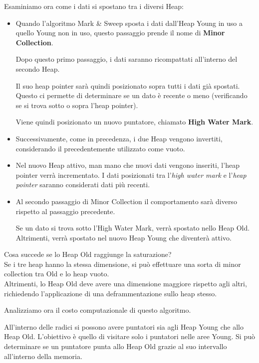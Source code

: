 \documentclass{article}
\begin{document}
Esaminiamo ora come i dati si spostano tra i diversi Heap:
\begin{itemize}
    \item Quando l'algoritmo Mark \& Sweep sposta i dati dall'Heap Young in uso a quello Young non in uso, questo passaggio prende il nome di \textbf{Minor Collection}.
    
    Dopo questo primo passaggio, i dati saranno ricompattati all'interno del secondo Heap.
    
    Il suo heap pointer sarà quindi posizionato sopra tutti i dati già spostati. Questo ci permette di determinare se un dato è recente o meno (verificando se si trova sotto o sopra l'heap pointer). 
    
    Viene quindi posizionato un nuovo puntatore, chiamato \textbf{High Water Mark}.
    \item Successivamente, come in precedenza, i due Heap vengono invertiti, considerando il precedentemente utilizzato come vuoto.
    \item Nel nuovo Heap attivo, man mano che nuovi dati vengono inseriti, l'heap pointer verrà incrementato. I dati posizionati tra l'\textit{high water mark} e l'\textit{heap pointer} saranno considerati dati più recenti. 
    \item Al secondo passaggio di Minor Collection il comportamento sarà diverso rispetto al passaggio precedente.
    
    Se un dato si trova sotto l'High Water Mark, verrà spostato nello Heap Old. Altrimenti, verrà spostato nel nuovo Heap Young che diventerà attivo.
\end{itemize}
\vspace{8pt}
Cosa succede se lo Heap Old raggiunge la saturazione?\\
Se i tre heap hanno la stessa dimensione, si può effettuare una sorta di minor collection tra Old e lo heap vuoto.\\
Altrimenti, lo Heap Old deve avere una dimensione maggiore rispetto agli altri, richiedendo l'applicazione di una deframmentazione sullo heap stesso.

\vspace{8pt}
Analizziamo ora il costo computazionale di questo algoritmo.

All'interno delle radici si possono avere puntatori sia agli Heap Young che allo Heap Old. L'obiettivo è quello di visitare solo i puntatori nelle aree Young. Si può determinare se un puntatore punta allo Heap Old grazie al suo intervallo all'interno della memoria.
\end{document}
